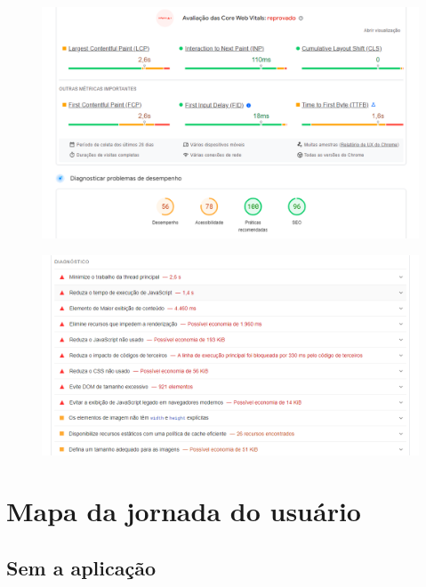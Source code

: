 \documentclass{article}
\begin{document}
\begin{figure}[H]
      \centering
      \includegraphics [width=1\textwidth]{IMGDOC/AnaliseMochileiros1.png}
      \label{pesq1 mochi}
\end{figure}
\begin{figure}[H]
      \centering
      \includegraphics [width=1\textwidth]{IMGDOC/AnaliseMochileiros2.png}
      \label{pesq2 mochi}
\end{figure}

\section{Mapa da jornada do usuário}
\subsection{Sem a aplicação}
\end{document}
